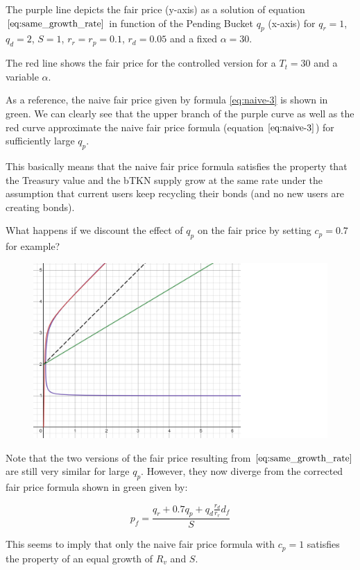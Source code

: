 \documentclass{article}
\begin{document}
The purple line depicts the fair price (y-axis) as a solution of equation $\ref{eq:same_growth_rate}$ in function of the Pending Bucket $q_p$ (x-axis) for $q_r=1$, $q_d=2$, $S=1$, $r_r=r_p=0.1$, $r_d=0.05$ and a fixed $\alpha=30$. 

The red line shows the fair price for the controlled version for a $T_t=30$ and a variable $\alpha$.

As a reference, the naive fair price given by formula \ref{eq:naive-3} is shown in green. We can clearly see that the upper branch of the purple curve as well as the red curve approximate the naive fair price formula (equation $\ref{eq:naive-3}$) for sufficiently large $q_p$. 

This basically means that the naive fair price formula satisfies the property that the Treasury value and the bTKN supply grow at the same rate under the assumption that current users keep recycling their bonds (and no new users are creating bonds).

What happens if we discount the effect of $q_p$ on the fair price by setting $c_p=0.7$ for example?

\begin{figure}[h]
    \centering
    \includegraphics[width=0.5\linewidth]{./ChickenBonds_Whitepaper_growth_price_2.png}
\end{figure}

Note that the two versions of the fair price resulting from $\ref{eq:same_growth_rate}$ are still very similar for large $q_p$. However, they now diverge from the corrected fair price formula shown in green given by:

\begin{equation}
  \label{eq:corrected-naive}
   p_f = \frac{q_r + 0.7q_p + q_d \frac{r_d}{r_r} d_f}{S}
\end{equation}

This seems to imply that only the naive fair price formula with $c_p=1$ satisfies the property of an equal growth of $R_v$ and $S$. 

\end{document}
